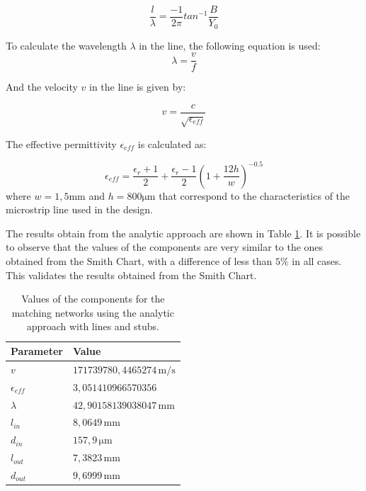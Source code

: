 \begin{equation}
    \frac{l}{\lambda} = \frac{-1}{2\pi}tan^{-1}\frac{B}{Y_0}
    \label{eq:llength}
\end{equation}

To calculate the wavelength $\lambda$ in the line, the following equation is used:
\begin{equation}
    \lambda = \frac{v}{f}
\end{equation}

And the velocity $v$ in the line is given by:

\begin{equation}
    v = \frac{c}{\sqrt{\epsilon_{eff}}}
\end{equation}

The effective permittivity $\epsilon_{eff}$ is calculated as:

\begin{equation}
    \epsilon_{eff} = \frac{\epsilon_r + 1}{2} + \frac{\epsilon_r - 1}{2}\left(1+\frac{12h}{w}\right)^{-0.5}
\end{equation}
where $w = 1,5 \si{\milli \meter}$ and $h = 800 \si{\micro \meter}$ that correspond to the characteristics of the microstrip line used in the design.


The results obtain from the analytic approach are shown in Table \ref{tab:MatchingValuesLines}. It is possible to observe that the values of the components are very similar to the ones obtained from the Smith Chart, with a difference of less than $5\%$ in all cases. This validates the results obtained from the Smith Chart.

\begin{table}[H]
    \centering
    \caption{Values of the components for the matching networks using the analytic approach with lines and stubs.}
    \begin{tabularx}{\textwidth}{>{\centering\arraybackslash}X >{\centering\arraybackslash}X}
        \toprule
        \textbf{Parameter} & \textbf{Value} \\
        \midrule
        $v$     & $171739780,4465274\,\si{\meter \per \second}$ \\
        \midrule
        $\epsilon_{eff}$     & $3,051410966570356$ \\
        \midrule
        $\lambda$     & $42,90158139038047\,\si{\milli\meter}$ \\
        \midrule
        $l_{in}$     & $8,0649\,\si{\milli\meter}$ \\
        \midrule
        $d_{in}$   & $157,9\,\si{\micro\meter}$ \\
        \midrule
        $l_{out}$     & $7,3823\,\si{\milli\meter}$\\
        \midrule
        $d_{out}$   & $9,6999\,\si{\milli\meter}$\\
        \bottomrule
    \end{tabularx}
    \label{tab:MatchingValuesLines}
\end{table}

